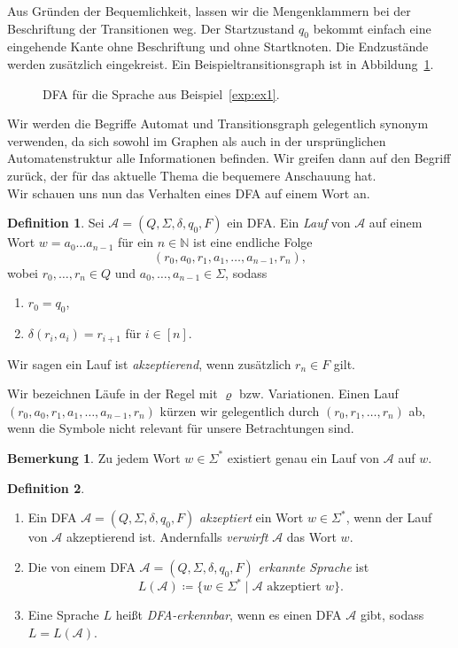 \documentclass[11pt, a4paper]{article}
\theoremstyle{definition}
\newtheorem{definition}{Definition}[section]
\newtheorem*{remark*}{Bemerkung}
\theoremstyle{plain}
\numberwithin{equation}{section}
\begin{document}
Aus Gründen der Bequemlichkeit, lassen wir die Mengenklammern bei der Beschriftung der Transitionen weg. Der Startzustand $q_0$ bekommt einfach eine eingehende Kante ohne Beschriftung und ohne Startknoten. Die Endzustände werden zusätzlich eingekreist. Ein Beispieltransitionsgraph ist in Abbildung~\ref{fig:dfa_ex1}.
\begin{figure}
	\centering
	
	\caption{DFA für die Sprache aus Beispiel~\ref{exp:ex1}.}
	\label{fig:dfa_ex1}
\end{figure}
Wir werden die Begriffe Automat und Transitionsgraph gelegentlich synonym verwenden, da sich sowohl im Graphen als auch in der ursprünglichen Automatenstruktur alle Informationen befinden. Wir greifen dann auf den Begriff zurück, der für das aktuelle Thema die bequemere Anschauung hat.\\
Wir schauen uns nun das Verhalten eines DFA auf einem Wort an.
\begin{definition}
	Sei $\mathcal{A} = (Q, \Sigma, \delta, q_0, F)$ ein DFA.
	Ein \textit{Lauf} von $\mathcal{A}$ auf einem Wort $w = a_0 \ldots a_{n-1}$ für ein $n \in \mathbb{N}$ ist eine endliche Folge
	$$
		(r_0, a_0, r_1, a_1, \ldots, a_{n-1}, r_n),
	$$
	wobei $r_0, \ldots, r_n \in Q$ und $a_0, \ldots, a_{n-1} \in \Sigma$, sodass
	\begin{enumerate}
		\item $r_0 = q_0$,
		\item $\delta(r_i, a_i) = r_{i+1}$ für $i \in [n]$.
	\end{enumerate}
	Wir sagen ein Lauf ist \textit{akzeptierend}, wenn zusätzlich $r_n \in F$ gilt.
\end{definition}
Wir bezeichnen Läufe in der Regel mit $\varrho$ bzw. Variationen. Einen Lauf $(r_0, a_0, r_1, a_1, \ldots, a_{n-1}, r_n)$ kürzen wir gelegentlich durch $(r_0, r_1, \ldots, r_n)$ ab, wenn die Symbole nicht relevant für unsere Betrachtungen sind.
\begin{remark*}
	Zu jedem Wort $w \in \Sigma^\ast$ existiert genau ein Lauf von $\mathcal{A}$ auf $w$.
\end{remark*}
\begin{definition}
\
	\begin{enumerate}
		\item Ein DFA $\mathcal{A} = (Q, \Sigma, \delta, q_0, F)$ \textit{akzeptiert} ein Wort $w \in \Sigma^\ast$, wenn der Lauf von $\mathcal{A}$ akzeptierend ist. Andernfalls \textit{verwirft} $\mathcal{A}$ das Wort $w$.
		\item Die von einem DFA $\mathcal{A} = (Q, \Sigma, \delta, q_0, F)$ \textit{erkannte Sprache} ist
			$$
				L(\mathcal{A}) \coloneqq \{ w \in \Sigma^\ast \mid \mathcal{A} \text{ akzeptiert } w \}.
			$$
		\item Eine Sprache $L$ heißt \textit{DFA-erkennbar}, wenn es einen DFA $\mathcal{A}$ gibt, sodass $L = L(\mathcal{A})$.
	\end{enumerate}
\end{definition}
\end{document}
